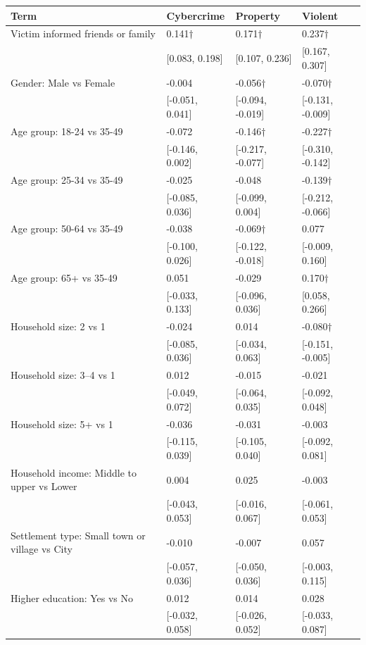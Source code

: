 
\begin{tabular}[t]{llll}
\toprule
Term & Cybercrime & Property & Violent\\
\midrule
Victim informed friends or family & 0.141$\dagger$ & 0.171$\dagger$ & 0.237$\dagger$\\
 & {}[0.083, 0.198] & {}[0.107, 0.236] & {}[0.167, 0.307]\\
Gender: Male vs Female & -0.004 & -0.056$\dagger$ & -0.070$\dagger$\\
 & {}[-0.051, 0.041] & {}[-0.094, -0.019] & {}[-0.131, -0.009]\\
Age group: 18-24 vs 35-49 & -0.072 & -0.146$\dagger$ & -0.227$\dagger$\\
 & {}[-0.146, 0.002] & {}[-0.217, -0.077] & {}[-0.310, -0.142]\\
Age group: 25-34 vs 35-49 & -0.025 & -0.048 & -0.139$\dagger$\\
 & {}[-0.085, 0.036] & {}[-0.099, 0.004] & {}[-0.212, -0.066]\\
Age group: 50-64 vs 35-49 & -0.038 & -0.069$\dagger$ & 0.077\\
 & {}[-0.100, 0.026] & {}[-0.122, -0.018] & {}[-0.009, 0.160]\\
Age group: 65+ vs 35-49 & 0.051 & -0.029 & 0.170$\dagger$\\
 & {}[-0.033, 0.133] & {}[-0.096, 0.036] & {}[0.058, 0.266]\\
Household size: 2 vs 1 & -0.024 & 0.014 & -0.080$\dagger$\\
 & {}[-0.085, 0.036] & {}[-0.034, 0.063] & {}[-0.151, -0.005]\\
Household size: 3–4 vs 1 & 0.012 & -0.015 & -0.021\\
 & {}[-0.049, 0.072] & {}[-0.064, 0.035] & {}[-0.092, 0.048]\\
Household size: 5+ vs 1 & -0.036 & -0.031 & -0.003\\
 & {}[-0.115, 0.039] & {}[-0.105, 0.040] & {}[-0.092, 0.081]\\
Household income: Middle to upper vs Lower & 0.004 & 0.025 & -0.003\\
 & {}[-0.043, 0.053] & {}[-0.016, 0.067] & {}[-0.061, 0.053]\\
Settlement type: Small town or village vs City & -0.010 & -0.007 & 0.057\\
 & {}[-0.057, 0.036] & {}[-0.050, 0.036] & {}[-0.003, 0.115]\\
Higher education: Yes vs No & 0.012 & 0.014 & 0.028\\
 & {}[-0.032, 0.058] & {}[-0.026, 0.052] & {}[-0.033, 0.087]\\

\end{tabular}
